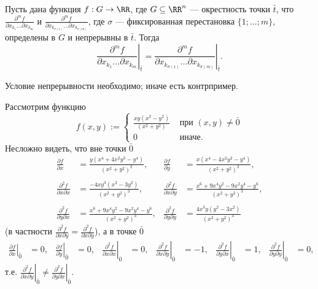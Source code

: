 \documentclass[12pt,a4paper]{article}
\begin{document}
    \begin{corollary}
        Пусть дана функция $f: G \to \RR$, где $G \subseteq \RR^n$ --- окрестность точки $\bar{t}$, что $\frac{\partial^m f}{\partial x_{k_1} \dots \partial x_{k_m}}$ и $\frac{\partial^m f}{\partial x_{k_{\sigma(1)}} \dots \partial x_{k_{\sigma(m)}}}$, где $\sigma$ --- фиксированная перестановка $\{1; \dots; m\}$, определены в $G$ и непрерывны в $\bar{t}$. Тогда
        \[\left. \frac{\partial^m f}{\partial x_{k_1} \dots \partial x_{k_m}} \right|_{\bar{t}} = \left. \frac{\partial^m f}{\partial x_{k_{\sigma(1)}} \dots \partial x_{k_{\sigma(m)}}} \right|_{\bar{t}}.\]
    \end{corollary}

    \begin{remark*}
        Условие непрерывности необходимо; иначе есть контрпример.

        Рассмотрим функцию
        \[
            f(x, y) :=
            \begin{cases}
                \frac{xy(x^2-y^2)}{(x^2+y^2)}& \text{ при } (x, y) \neq \bar{0}\\
                0& \text{ иначе}.
            \end{cases}
        \]
        Несложно видеть, что вне точки $\bar{0}$
        \begin{align*}
            \frac{\partial f}{\partial x} &= \frac{y(x^4 + 4 x^2 y^3 - y^4)}{(x^2 + y^2)^2},&
            \frac{\partial f}{\partial y} &= \frac{x(x^4 - 4 x^2 y^2 - y^4)}{(x^2 + y^2)^2},\\\\
            \frac{\partial^2 f}{\partial x \partial x} &= \frac{-4 x y^3 (x^2 - 3y^2)}{(x^2 + y^2)^3},&
            \frac{\partial^2 f}{\partial x \partial y} &= \frac{x^6 + 9 x^4 y^2 - 9 x^2 y^4 - y^6}{(x^2 + y^2)^3},\\\\
            \frac{\partial^2 f}{\partial y \partial x} &= \frac{x^6 + 9 x^4 y^2 - 9 x^2 y^4 - y^6}{(x^2 + y^2)^3},&
            \frac{\partial^2 f}{\partial y \partial y} &= \frac{4 x^3 y (y^2 - 3x^2)}{(x^2 + y^2)^3}
        \end{align*}
        (в частности $\frac{\partial^2 f}{\partial x \partial y} = \frac{\partial^2 f}{\partial x \partial y}$), а в точке $\bar{0}$
        \begin{align*}
            \left. \frac{\partial f}{\partial x} \right|_{\bar{0}} &= 0,&
            \left. \frac{\partial f}{\partial y} \right|_{\bar{0}} &= 0,&
            \left. \frac{\partial^2 f}{\partial x \partial x} \right|_{\bar{0}} &= 0,&
            \left. \frac{\partial^2 f}{\partial x \partial y} \right|_{\bar{0}} &= -1,&
            \left. \frac{\partial^2 f}{\partial y \partial x} \right|_{\bar{0}} &= 1,&
            \left. \frac{\partial^2 f}{\partial y \partial y} \right|_{\bar{0}} &= 0,
        \end{align*}
        т.е. $\left. \frac{\partial^2 f}{\partial x \partial y} \right|_{\bar{0}} \neq \left. \frac{\partial^2 f}{\partial y \partial x} \right|_{\bar{0}}$.
        

\end{remark*}
\end{document}
